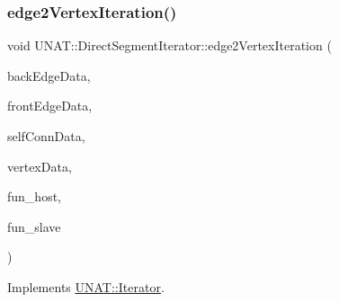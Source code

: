 \subsubsection{\texorpdfstring{edge2VertexIteration()}{edge2VertexIteration()}\hspace{0.1cm}{\footnotesize\ttfamily [2/2]}}
{\footnotesize\ttfamily void U\+N\+A\+T\+::\+Direct\+Segment\+Iterator\+::edge2\+Vertex\+Iteration (\begin{DoxyParamCaption}\item[{\mbox{\hyperlink{structArrays}{Arrays}} $\ast$}]{back\+Edge\+Data,  }\item[{\mbox{\hyperlink{structArrays}{Arrays}} $\ast$}]{front\+Edge\+Data,  }\item[{\mbox{\hyperlink{structArrays}{Arrays}} $\ast$}]{self\+Conn\+Data,  }\item[{\mbox{\hyperlink{structArrays}{Arrays}} $\ast$}]{vertex\+Data,  }\item[{\mbox{\hyperlink{test_2directSegment_2iterator_8h_ae588e578b6781906a44208130df0ab29}{e2v\+\_\+host\+Fun\+Ptr}}}]{fun\+\_\+host,  }\item[{\mbox{\hyperlink{test_2directSegment_2iterator_8h_a7b58029f74760f3ca5384034c0e89c15}{e2v\+\_\+slave\+Fun\+Ptr}}}]{fun\+\_\+slave }\end{DoxyParamCaption})\hspace{0.3cm}{\ttfamily [virtual]}}



Implements \mbox{\hyperlink{classUNAT_1_1Iterator_a59fb9d4c251dd0456078decabf332399}{U\+N\+A\+T\+::\+Iterator}}.

